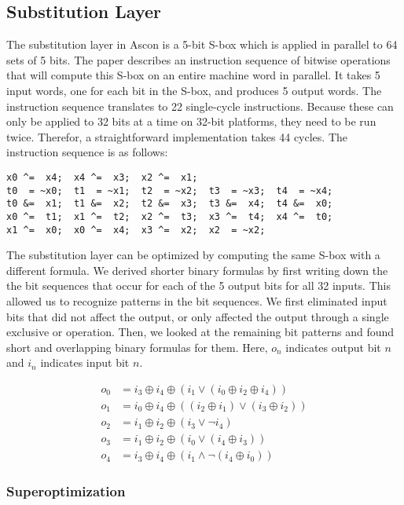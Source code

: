 \subsection{Substitution Layer}

The substitution layer in Ascon is a 5-bit S-box which is applied in
parallel to 64 sets of 5 bits. The paper describes an instruction
sequence of bitwise operations that will compute this S-box on an entire
machine word in parallel. It takes 5 input words, one for each bit in
the S-box, and produces 5 output words. The instruction sequence
translates to 22 single-cycle instructions. Because these can only be
applied to 32 bits at a time on 32-bit platforms, they need to be run
twice. Therefor, a straightforward implementation takes 44 cycles. The
instruction sequence is as follows:

\begin{verbatim}
x0 ^=  x4;  x4 ^=  x3;  x2 ^=  x1;
t0  = ~x0;  t1  = ~x1;  t2  = ~x2;  t3  = ~x3;  t4  = ~x4;
t0 &=  x1;  t1 &=  x2;  t2 &=  x3;  t3 &=  x4;  t4 &=  x0;
x0 ^=  t1;  x1 ^=  t2;  x2 ^=  t3;  x3 ^=  t4;  x4 ^=  t0;
x1 ^=  x0;  x0 ^=  x4;  x3 ^=  x2;  x2  = ~x2;
\end{verbatim}

The substitution layer can be optimized by computing the same S-box with
a different formula. We derived shorter binary formulas by first writing
down the the bit sequences that occur for each of the 5 output bits for
all 32 inputs. This allowed us to recognize patterns in the bit
sequences. We first eliminated input bits that did not affect the
output, or only affected the output through a single exclusive or
operation. Then, we looked at the remaining bit patterns and found short
and overlapping binary formulas for them. Here, $o_n$ indicates output
bit $n$ and $i_n$ indicates input bit $n$.

\begin{align}
   o_0 & = i_3 \oplus i_4 \oplus (i_1 \vee (i_0 \oplus i_2 \oplus i_4))
\\ o_1 & = i_0 \oplus i_4 \oplus ((i_2 \oplus i_1) \vee (i_3 \oplus i_2))
\\ o_2 & = i_1 \oplus i_2 \oplus (i_3 \vee \neg i_4)
\\ o_3 & = i_1 \oplus i_2 \oplus (i_0 \vee (i_4 \oplus i_3))
\\ o_4 & = i_3 \oplus i_4 \oplus (i_1 \wedge \neg (i_4 \oplus i_0))
\end{align}

\subsubsection{Superoptimization}
